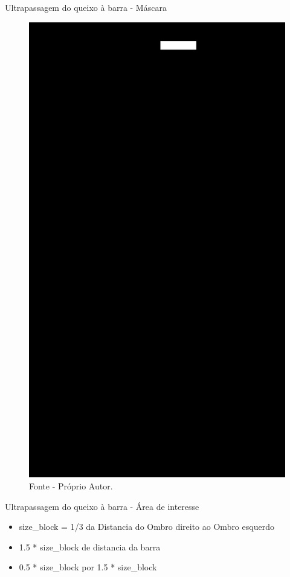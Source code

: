 \begin{frame}{Ultrapassagem do queixo à barra - Máscara}
    \begin{figure}[!ht]
        \centering
            \includegraphics[scale=0.1]{img/desenvolvimento/ultrapassagemBarra/mask_head.png}
        \caption*{Fonte - Próprio Autor.}
    \end{figure}
\end{frame}

\begin{frame}{Ultrapassagem do queixo à barra - Área de interesse}
    \begin{itemize}
        \item size\_block = 1/3 da Distancia do Ombro direito ao Ombro esquerdo
        \item 1.5 * size\_block de distancia da barra
        \item 0.5 * size\_block por  1.5 * size\_block
    \end{itemize}
\end{frame}

